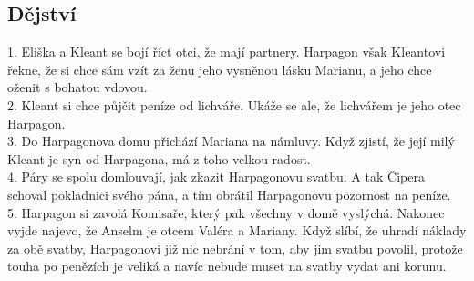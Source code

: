 \subsection*{Dějství}
1. Eliška a Kleant se bojí říct otci, že mají partnery.
Harpagon však Kleantovi řekne, že si chce sám vzít za ženu jeho vysněnou lásku Marianu, a jeho chce oženit s bohatou vdovou. \\
2. Kleant si chce půjčit peníze od lichváře.
Ukáže se ale, že lichvářem je jeho otec Harpagon. \\
3. Do Harpagonova domu přichází Mariana na námluvy.
Když zjistí, že její milý Kleant je syn od Harpagona, má z toho velkou radost. \\
4. Páry se spolu domlouvají, jak zkazit Harpagonovu svatbu.
A tak Čipera schoval pokladnici svého pána, a tím obrátil Harpagonovu pozornost na peníze. \\
5. Harpagon si zavolá Komisaře, který pak všechny v domě vyslýchá.
Nakonec vyjde najevo, že Anselm je otcem Valéra a Mariany.
Když slíbí, že uhradí náklady za obě svatby, Harpagonovi již nic nebrání v tom, aby jim svatbu povolil, protože touha po penězích je veliká a navíc nebude muset na svatby vydat ani korunu.
